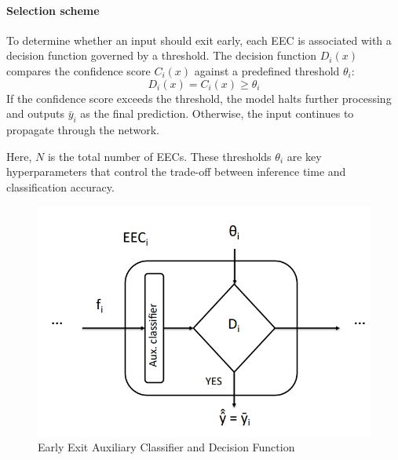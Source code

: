 \paragraph*{Selection scheme}
To determine whether an input should exit early, each EEC is associated with a decision function governed by a threshold.
The decision function $D_i(x)$ compares the confidence score $C_i (x)$  against a predefined threshold $\theta_i$: 
\[D_i(x) = C_i (x) \geq \theta_i\]
\noindent If the confidence score exceeds the threshold, the model halts further processing and outputs $\bar{y}_i$ as the final prediction.
Otherwise, the input continues to propagate through the network.

Here, $N$ is the total number of EECs. 
These thresholds $\theta_i$ are key hyperparameters that control the trade-off between inference time and classification accuracy.
\begin{figure}[H]
    \centering
    \includegraphics[width=0.75\linewidth]{images/eeai12.png}
    \caption{Early Exit Auxiliary Classifier and Decision Function}
\end{figure}